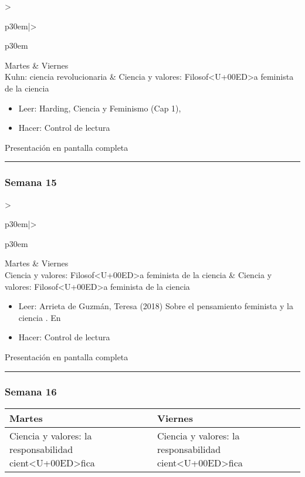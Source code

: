 \documentclass[spanish,]{article}
\begin{document}
\begin{tabular}{>{\raggedright\arraybackslash}p{30em}|>{\raggedright\arraybackslash}p{30em}}
\hline
Martes & Viernes\\
\hline
Kuhn: ciencia revolucionaria & Ciencia y valores: Filosof<U+00ED>a feminista de la ciencia\\
\hline
\end{tabular}

\begin{itemize}
\item
  Leer: Harding, Ciencia y Feminismo (Cap 1),
\item
  Hacer: Control de lectura
\end{itemize}

Presentación en pantalla completa

\begin{center}\rule{0.5\linewidth}{\linethickness}\end{center}

\subsubsection{Semana 15}\label{semana-15}

\begin{tabular}{>{\raggedright\arraybackslash}p{30em}|>{\raggedright\arraybackslash}p{30em}}
\hline
Martes & Viernes\\
\hline
Ciencia y valores: Filosof<U+00ED>a feminista de la ciencia & Ciencia y valores: Filosof<U+00ED>a feminista de la ciencia\\
\hline
\end{tabular}

\begin{itemize}
\item
  Leer: Arrieta de Guzmán, Teresa (2018) Sobre el pensamiento feminista
  y la ciencia . En
\item
  Hacer: Control de lectura
\end{itemize}

Presentación en pantalla completa

\begin{center}\rule{0.5\linewidth}{\linethickness}\end{center}

\subsubsection{Semana 16}\label{semana-16}

\begin{tabular}{>{\raggedright\arraybackslash}p{30em}|>{\raggedright\arraybackslash}p{30em}}
\hline
Martes & Viernes\\
\hline
Ciencia y valores: la responsabilidad cient<U+00ED>fica & Ciencia y valores: la responsabilidad cient<U+00ED>fica\\
\hline
\end{tabular}
\end{document}
